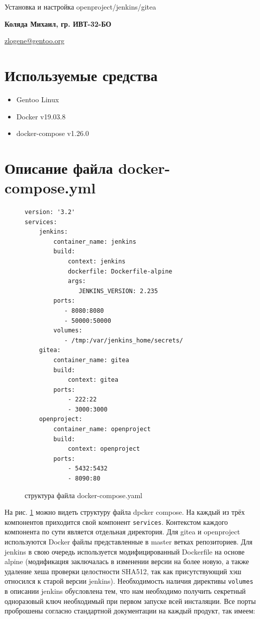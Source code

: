 \documentclass[a4paper]{extarticle}
\begin{document}
\begin{center}
        
    \vspace{0.4cm}
    \large
    Установка и настройка openproject/jenkins/gitea
        
    \vspace{0.4cm}
    \textbf{Коляда Михаил, гр. ИВТ-32-БО}
       
    \vspace{0.3cm}
    \href{mailto:zlogene@gentoo.org}{zlogene@gentoo.org}
\end{center}

\section{Используемые средства}

\begin{itemize}
\item Gentoo Linux
\item Docker v19.03.8
\item docker-compose v1.26.0
\end{itemize}

\section{Описание файла docker-compose.yml}

\begin{figure}[h!]
\begin{verbatim}
version: '3.2'
services:
    jenkins:
        container_name: jenkins
        build:
            context: jenkins
            dockerfile: Dockerfile-alpine
            args:
               JENKINS_VERSION: 2.235
        ports:
           - 8080:8080
           - 50000:50000
        volumes:
           - /tmp:/var/jenkins_home/secrets/
    gitea:
        container_name: gitea
        build:
            context: gitea
        ports:
            - 222:22
            - 3000:3000
    openproject:
        container_name: openproject
        build:
            context: openproject
        ports:
            - 5432:5432
            - 8090:80
\end{verbatim}
\caption{структура файла docker-compose.yaml}
\label{fig:dcy}
\end{figure}

На рис. \ref{fig:dcy} можно видеть структуру файла dpcker compose. На каждый из трёх компонентов приходится свой компонент \texttt{services}. Контекстом каждого компонента по сути является отдельная директория. Для gitea и openproject используются Docker файлы представленные в master ветках репозиториев. Для jenkins в свою очередь используется модифицированный Dockerfile на основе alpine (модификация заключалась в изменении версии на более новую, а также удаление хеша  проверки целостности SHA512, так как присутствующий хэш относился к старой версии jenkins). Необходимость наличия директивы \texttt{volumes} в описании jenkins обусловлена тем, что нам необходимо получить секретный одноразовый ключ необходимый при первом запуске всей	инсталяции.
Все порты проброшены согласно стандартной документации на каждый продукт, так имеем:
\end{document}

